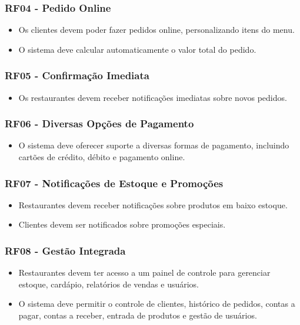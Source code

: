 \subsubsection*{RF04 - Pedido Online}
\begin{itemize}
    \item Os clientes devem poder fazer pedidos online, personalizando itens do menu.
    \item O sistema deve calcular automaticamente o valor total do pedido.
\end{itemize}

\subsubsection*{RF05 - Confirmação Imediata}
\begin{itemize}
    \item Os restaurantes devem receber notificações imediatas sobre novos pedidos.
\end{itemize}

\subsubsection*{RF06 - Diversas Opções de Pagamento}
\begin{itemize}
    \item O sistema deve oferecer suporte a diversas formas de pagamento, incluindo cartões de crédito, débito e pagamento online.
\end{itemize}

\subsubsection*{RF07 - Notificações de Estoque e Promoções}
\begin{itemize}
    \item Restaurantes devem receber notificações sobre produtos em baixo estoque.
    \item Clientes devem ser notificados sobre promoções especiais.
\end{itemize}

\subsubsection*{RF08 - Gestão Integrada}
\begin{itemize}
    \item Restaurantes devem ter acesso a um painel de controle para gerenciar estoque, cardápio, relatórios de vendas e usuários.
    \item O sistema deve permitir o controle de clientes, histórico de pedidos, contas a pagar, contas a receber, entrada de produtos e gestão de usuários.
\end{itemize}


